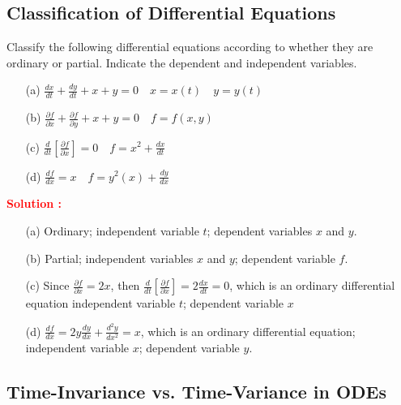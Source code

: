\documentclass[12pt]{article}
\begin{document}
\clearpage
\subsection{Classification of Differential Equations}

Classify the following differential equations according to whether they are ordinary or partial. Indicate the dependent and independent variables.
\begin{itemize}
    \item[(a)] \(\frac{dx}{dt} + \frac{dy}{dt} + x + y = 0 \quad x = x(t) \quad y = y(t)\)
    \item[(b)] \(\frac{\partial f}{\partial x} + \frac{\partial f}{\partial y} + x + y = 0 \quad f = f(x,y) \)
    \item[(c)] \( \frac{d}{dt}\left[ \frac{\partial f}{\partial x} \right] = 0 \quad f = x^2 + \frac{dx}{dt}\)
    \item[(d)] \(\frac{df}{dx} = x \quad f = y^2(x) + \frac{dy}{dx}\)
\end{itemize}
\textbf{\textcolor{red}{Solution :}} \\
\begin{itemize}
    \item[(a)] Ordinary; independent variable \(t\); dependent variables \(x\) and \(y\).
    \item[(b)] Partial; independent variables \(x\) and \(y\); dependent variable \(f\).
    \item[(c)] Since \(\frac{\partial f}{\partial x} = 2x\), then \(\frac{d}{dt}\left[ \frac{\partial f}{\partial x} \right] = 2\frac{dx}{dt} = 0\), which is an ordinary differential equation independent variable \(t\); dependent variable \(x\)
    \item[(d)] \(\frac{df}{dx} = 2y \frac{dy}{dx} + \frac{d^2y}{dx^2} =  x\), which is an ordinary differential equation; independent variable \(x\); dependent variable \(y\).
\end{itemize}

\clearpage
\subsection{Time-Invariance vs. Time-Variance in ODEs}
\end{document}
